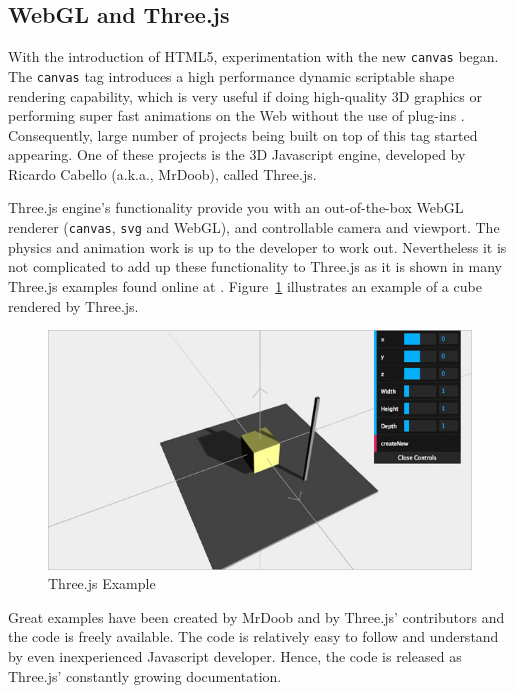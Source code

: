 \subsection{WebGL and Three.js}

With the introduction of HTML5, experimentation with the new  \texttt{canvas} began. The \texttt{canvas} tag introduces a high performance dynamic scriptable shape rendering capability, which is very useful if doing high-quality 3D graphics or performing super fast animations on the Web without the use of plug-ins \cite{wiki:webgl}. Consequently, large number of projects being built on top of this tag started appearing. One of these projects is the 3D Javascript engine, developed by Ricardo Cabello (a.k.a., MrDoob), called Three.js.  

Three.js engine's functionality provide you with an out-of-the-box WebGL renderer (\texttt{canvas}, \texttt{svg} and WebGL), and controllable camera and viewport. The physics and animation work is up to the developer to work out. Nevertheless it is not complicated to add up these functionality to Three.js as it is shown in many Three.js examples found online at \cite{threeJS}. Figure~\ref{fig:threejs} illustrates an example of a cube rendered by Three.js.

\begin{figure}
	\center
	\includegraphics[scale=0.45]{images/basicsThreeJS.png}
	\caption{Three.js Example}
	\label{fig:threejs}
\end{figure}


Great examples have been created by MrDoob and by Three.js' contributors and the code is freely available. The code is relatively easy to follow and understand by even inexperienced Javascript developer. Hence, the code is released as Three.js' constantly growing documentation. 

